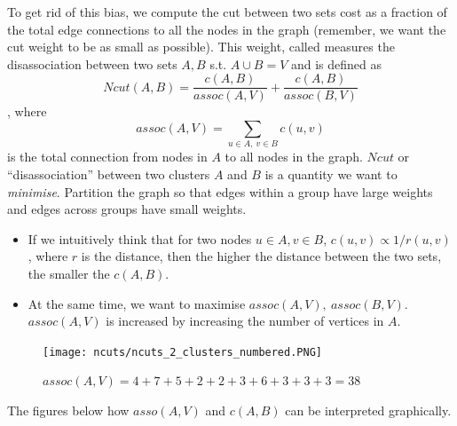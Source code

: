 \documentclass[a4paper]{article}
\begin{document}
To get rid of this bias, we compute the cut between two sets cost as a fraction of the total edge connections to all the nodes in the graph (remember, we want the cut weight to be as small as possible). This weight, called  measures the disassociation between  two sets $A,B$ s.t. $A\cup B = V$ and is defined  as
\begin{equation}
    Ncut(A,B) = \frac{c(A,B)}{assoc(A,V)} + \frac{c(A,B)}{assoc(B,V)}
    \label{eq:ncut_def}
\end{equation}
, where
\begin{equation}
    assoc(A,V) = \sum\limits_{u\in A,\ v\in B}{c\left( u,v \right)}
\end{equation}
is the total connection from nodes in $A$ to all nodes in the graph. $Ncut$ or ``disassociation'' between two clusters $A$ and $B$ is a quantity we want to \textit{minimise}. Partition the graph so that edges within a group have large weights and edges across groups have small weights.
\begin{itemize}
    \item If we intuitively think that for two nodes $u\in A,v\in B$, $c(u,v) \propto 1/r(u,v)$, where $r$ is the distance, then the higher the distance between the two sets, the smaller the $c(A,B)$.
    \item At the same time, we want to maximise $assoc(A,V),\ assoc(B,V)$. $assoc(A,V)$ is increased by increasing the number of vertices in $A$.
\end{itemize}
\begin{figure}[H]
	\centering %
	\texttt{[image: ncuts/ncuts\_2\_clusters\_numbered.PNG]}
    \caption{$assoc(A,V) = 4+7+5+2+2+3+6+3+3+3=38$}
\end{figure}

The figures below how $asso(A,V)$ and $c(A,B)$ can be interpreted graphically.
\end{document}
